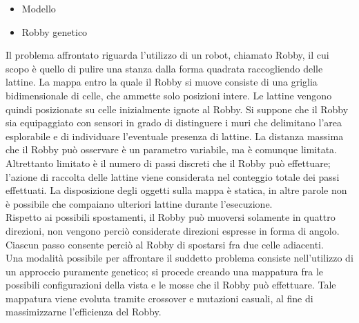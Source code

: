 \begin{itemize}
 \item Modello
 \item Robby genetico
\end{itemize}
Il problema affrontato riguarda l'utilizzo di un robot, chiamato Robby, il cui 
scopo è quello di pulire una stanza dalla forma quadrata raccogliendo delle lattine.
La mappa entro la quale il Robby si muove consiste di una griglia 
bidimensionale di celle, che ammette solo posizioni intere.
Le lattine vengono quindi posizionate su celle inizialmente ignote al Robby. Si 
suppone che il Robby sia equipaggiato con sensori in grado di distinguere i muri 
che delimitano l'area esplorabile e di individuare l'eventuale presenza di lattine. La distanza 
massima che il Robby può osservare è un parametro variabile, ma è comunque 
limitata. Altrettanto limitato è il numero di passi discreti che il Robby può 
effettuare; l'azione di raccolta delle lattine viene considerata nel conteggio 
totale dei passi effettuati. La disposizione degli oggetti sulla mappa è 
statica, in altre parole non è possibile che compaiano
ulteriori lattine durante l'esecuzione.
\\
Rispetto ai possibili spostamenti, il Robby può muoversi solamente
in quattro direzioni, non vengono perciò considerate direzioni espresse in 
forma di angolo. Ciascun passo consente perciò al Robby di spostarsi fra due celle 
adiacenti.
\\
Una modalità possibile per affrontare il suddetto problema consiste 
nell'utilizzo di un approccio puramente genetico; si procede creando una 
mappatura fra le possibili configurazioni della vista e le mosse che il Robby 
può effettuare. Tale mappatura viene evoluta tramite crossover e mutazioni 
casuali, al fine di massimizzarne l'efficienza del Robby.
